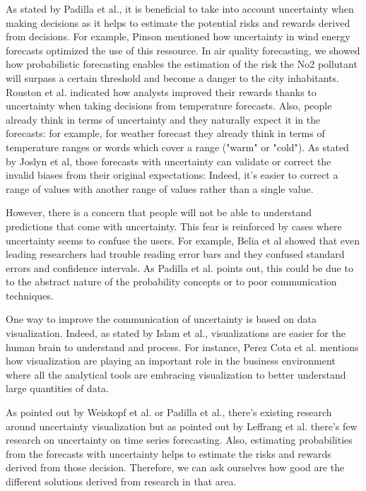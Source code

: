\documentclass[a4paper,3p,sort&compress]{elsarticle}
\begin{document}
As stated by Padilla et al., it is beneficial to take into account uncertainty when making decisions as it
helps to estimate the potential risks and rewards derived from decisions. For example, Pinson mentioned how uncertainty 
in wind energy forecasts optimized the use of this ressource. In air quality forecasting, we showed 
how probabilistic forecasting enables the estimation of the risk the No2 pollutant will surpass a certain threshold 
and become a danger to the city inhabitants. Rouston et al. \cite{roulston_laboratory_2006} indicated how analysts 
improved their rewards thanks to uncertainty when taking decisions from temperature forecasts.
Also, people already think in terms of uncertainty and they naturally expect it in the forecasts: 
for example, for weather forecast 
they already think in terms of temperature ranges or words which cover a range ("warm" or "cold"). As stated by Joslyn et al, 
those forecasts with uncertainty can validate or correct the invalid biases from their original expectations: Indeed,
it's easier to correct a range of values with another range of values rather than a single value.

However, there is a concern that people will not be able to understand predictions that come with uncertainty.
This fear is reinforced by cases where uncertainty seems to confuse the users. For example,
Belia et al \cite{belia_researchers_2005} showed that even leading researchers had 
trouble reading error bars and they confused 
standard errors and confidence intervals. 
As Padilla et al. \cite{balakrishnan_uncertainty_2021} 
points out, this could be due to to the abstract nature of the probability concepts or to poor communication techniques. 

One way to improve the communication of uncertainty is based on data visualization. Indeed, as 
stated by Islam et al., visualizations are easier for the human brain to understand and process.
For instance, Perez Cota et al. mentions how visualization are playing an important role in the business 
environment where all the analytical tools are embracing visualization to better understand large quantities of data. 

As pointed out by Weiskopf et al. or Padilla et al., there's existing research around uncertainty visualization 
but as pointed out by Leffrang et al. there's few research on uncertainty on time series forecasting. Also, 
estimating probabilities from the forecasts with uncertainty helps to estimate the risks and rewards derived from those 
decision. Therefore, we can ask ourselves how good are the different solutions derived from research in that area. 
\end{document}
